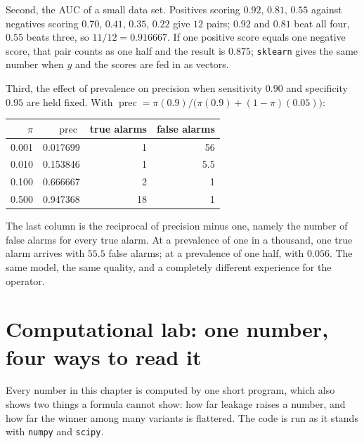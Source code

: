 Second, the AUC of a small data set. Positives scoring $0.92$, $0.81$, $0.55$ against negatives
scoring $0.70$, $0.41$, $0.35$, $0.22$ give $12$ pairs; $0.92$ and $0.81$ beat all four, $0.55$
beats three, so $11/12=0.916667$. If one positive score equals one negative score, that pair counts
as one half and the result is $0.875$; \texttt{sklearn} gives the same number when $y$ and the
scores are fed in as vectors.

Third, the effect of prevalence on precision when sensitivity $0.90$ and specificity $0.95$ are held
fixed. With $\operatorname{prec}=\pi(0.9)/\bigl(\pi(0.9)+(1-\pi)(0.05)\bigr)$:

\begin{center}
\small
\begin{tabular}{rrrr}
\hline
$\pi$ & $\operatorname{prec}$ & true alarms & false alarms \\
\hline
0.001 & 0.017699 & 1 & 56 \\
0.010 & 0.153846 & 1 & 5.5 \\
0.100 & 0.666667 & 2 & 1 \\
0.500 & 0.947368 & 18 & 1 \\
\hline
\end{tabular}
\end{center}

The last column is the reciprocal of precision minus one, namely the number of false alarms for
every true alarm. At a prevalence of one in a thousand, one true alarm arrives with $55.5$ false
alarms; at a prevalence of one half, with $0.056$. The same model, the same quality, and a
completely different experience for the operator.


\section{Computational lab: one number, four ways to read it}

Every number in this chapter is computed by one short program, which also shows two things a
formula cannot show: how far leakage raises a number, and how far the winner among many variants is
flattered. The code is run as it stands with \texttt{numpy} and \texttt{scipy}.

